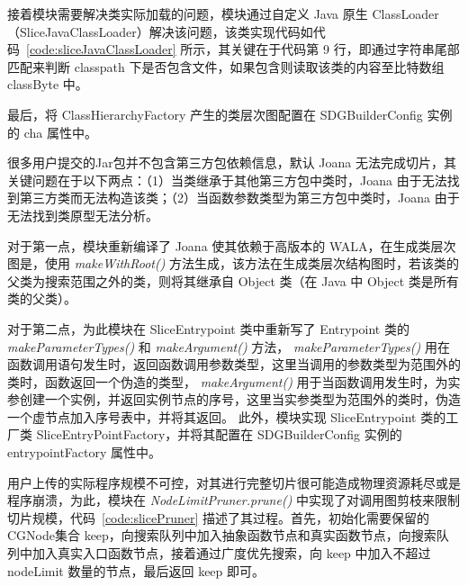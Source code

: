 接着模块需要解决类实际加载的问题，模块通过自定义 Java 原生 ClassLoader（SliceJavaClassLoader）解决该问题，该类实现代码如代码~\ref{code:sliceJavaClassLoader} 所示，其关键在于代码第 9 行，即通过字符串尾部匹配来判断 classpath 下是否包含文件，如果包含则读取该类的内容至比特数组 classByte 中。 

最后，将 ClassHierarchyFactory 产生的类层次图配置在 SDGBuilderConfig 实例的 cha 属性中。

\begin{minipage}[!htbp]{0.9\textwidth}
    
\end{minipage}

\begin{minipage}[!htbp]{0.9\textwidth}
    
\end{minipage}


很多用户提交的Jar包并不包含第三方包依赖信息，默认 Joana 无法完成切片，其关键问题在于以下两点：（1）当类继承于其他第三方包中类时，Joana 由于无法找到第三方类而无法构造该类；（2）当函数参数类型为第三方包中类时，Joana 由于无法找到类原型无法分析。

对于第一点，模块重新编译了 Joana 使其依赖于高版本的 WALA，在生成类层次图是，使用 \textit{makeWithRoot()} 方法生成，该方法在生成类层次结构图时，若该类的父类为搜索范围之外的类，则将其继承自 Object 类（在 Java 中 Object 类是所有类的父类）。

对于第二点，为此模块在 SliceEntrypoint 类中重新写了 Entrypoint 类的\textit{ makeParameterTypes()} 和 \textit{makeArgument()} 方法，\textit{ makeParameterTypes()} 用在函数调用语句发生时，返回函数调用参数类型，这里当调用的参数类型为范围外的类时，函数返回一个伪造的类型，\textit{ makeArgument()} 用于当函数调用发生时，为实参创建一个实例，并返回实例节点的序号，这里当实参类型为范围外的类时，伪造一个虚节点加入序号表中，并将其返回。
此外，模块实现 SliceEntrypoint 类的工厂类 SliceEntryPointFactory，并将其配置在 SDGBuilderConfig 实例的 entrypointFactory 属性中。

\begin{minipage}[htbp]{0.9\textwidth}
    
\end{minipage}


用户上传的实际程序规模不可控，对其进行完整切片很可能造成物理资源耗尽或是程序崩溃，为此，模块在 \textit{NodeLimitPruner.prune()} 中实现了对调用图剪枝来限制切片规模，代码~\ref{code:slicePruner} 描述了其过程。首先，初始化需要保留的CGNode集合 keep，向搜索队列中加入抽象函数节点和真实函数节点，向搜索队列中加入真实入口函数节点，接着通过广度优先搜索，向 keep 中加入不超过 nodeLimit 数量的节点，最后返回 keep 即可。


